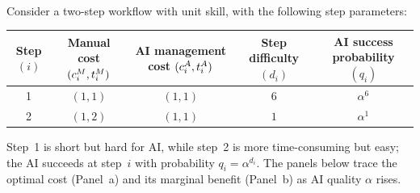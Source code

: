 \documentclass[12pt, final]{article}
\begin{document}
\\[-0.2em]
\noindent{\color{black!25}\rule{\linewidth}{0.4pt}}\par\vspace{1em}
\renewcommand\theexample{\arabic{example}}
\setcounter{example}{3}
\begin{example}
\label{ex:nonmonotone}
Consider a two-step workflow with unit skill, with the following step parameters:
\begin{center}
\begin{tabular}{c|cccc}
\toprule
\makecell{Step\\$(i)$} & \makecell{Manual cost\\$(c^{M}_{i}, t^{M}_{i})$} & \makecell{AI management cost\\$(c^{A}_{i}, t^{A}_{i})$} & \makecell{Step difficulty\\$(d_i)$} & \makecell{AI success probability\\$(q_i)$} \\
\midrule
1 & $(1, 1)$ & $(1, 1)$ & $6$ & $\alpha^{6}$ \\
2 & $(1, 2)$ & $(1, 1)$ & $1$ & $\alpha^{1}$ \\
\bottomrule
\end{tabular}
\end{center}
Step~1 is short but hard for AI, while step~2 is more time-consuming but easy; the AI succeeds at step~$i$ with probability $q_i = \alpha^{d_i}$.
The panels below trace the optimal cost (Panel~a) and its marginal benefit (Panel~b) as AI quality $\alpha$ rises.


\end{example}
\end{document}
